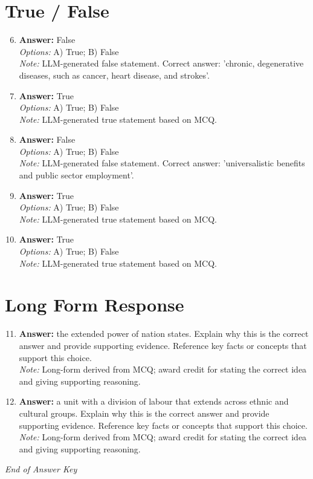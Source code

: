 \documentclass[12pt]{article}
\begin{document}
\section*{True / False}
\begin{enumerate}[label=\arabic*.]
\setcounter{enumi}{5}
\item \textbf{Answer:} False
\\ \textit{Options:} A) True; B) False
\\ \textit{Note:} LLM-generated false statement. Correct answer: 'chronic, degenerative diseases, such as cancer, heart disease, and strokes'.
\item \textbf{Answer:} True
\\ \textit{Options:} A) True; B) False
\\ \textit{Note:} LLM-generated true statement based on MCQ.
\item \textbf{Answer:} False
\\ \textit{Options:} A) True; B) False
\\ \textit{Note:} LLM-generated false statement. Correct answer: 'universalistic benefits and public sector employment'.
\item \textbf{Answer:} True
\\ \textit{Options:} A) True; B) False
\\ \textit{Note:} LLM-generated true statement based on MCQ.
\item \textbf{Answer:} True
\\ \textit{Options:} A) True; B) False
\\ \textit{Note:} LLM-generated true statement based on MCQ.
\end{enumerate}

\section*{Long Form Response}
\begin{enumerate}[label=\arabic*.]
\setcounter{enumi}{10}
\item \textbf{Answer:} the extended power of nation states. Explain why this is the correct answer and provide supporting evidence. Reference key facts or concepts that support this choice.
\\ \textit{Note:} Long-form derived from MCQ; award credit for stating the correct idea and giving supporting reasoning.
\item \textbf{Answer:} a unit with a division of labour that extends across ethnic and cultural groups. Explain why this is the correct answer and provide supporting evidence. Reference key facts or concepts that support this choice.
\\ \textit{Note:} Long-form derived from MCQ; award credit for stating the correct idea and giving supporting reasoning.
\end{enumerate}

\vfill
\noindent\textit{End of Answer Key}
\end{document}

